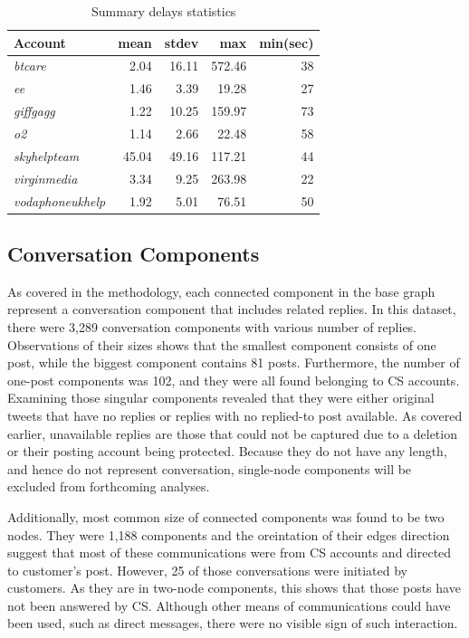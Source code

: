 \documentclass[sigconf]{acmart}
\begin{document}
\begin{table}[!h]
\centering
\begin{tabularx}{\columnwidth}{lrrrr}
\toprule
\textbf{Account} & \textbf{mean} & \textbf{stdev} & \textbf{max} & \textbf{min(sec)} \\ 
\midrule
{\emph{btcare}} & 2.04 & 16.11 & 572.46 & 38\\
{\emph{ee}} & 1.46 & 3.39 & 19.28 & 27\\
{\emph{giffgagg}} & 1.22 & 10.25 & 159.97 & 73\\ 
{\emph{o2}} & 1.14 & 2.66 & 22.48 & 58\\
{\emph{skyhelpteam}} & 45.04 & 49.16 & 117.21 & 44\\
{\emph{virginmedia}} & 3.34 & 9.25 & 263.98 & 22\\
{\emph{vodaphoneukhelp}} & 1.92 & 5.01 & 76.51 & 50\\
\bottomrule
\end{tabularx}
\caption{Summary delays statistics}
\label{tbl:delaystats}
\end{table}

\subsection{Conversation Components}

As covered in the methodology, each connected component in the
base graph represent a conversation component that includes related
replies. In this dataset, there were 3,289 conversation components
with various number of replies. Observations of their sizes shows that
the smallest component consists of one post, while the biggest
component contains 81 posts.  Furthermore, the number of one-post
components was 102, and they were all found belonging to CS
accounts. Examining those singular components revealed that they were
either original tweets that have no replies or replies with no
replied-to post available. As covered earlier, unavailable replies are
those that could not be captured due to a deletion or their posting
account being protected. Because they do not have any length, and
hence do not represent conversation, single-node
components will be excluded from forthcoming analyses.

Additionally, most common size of connected components was found to be
two nodes.  They were 1,188 components and the oreintation of their
edges direction suggest that most of these communications were from CS accounts
and directed to customer's post. However, 25 of those conversations
were initiated by customers.  As they are in two-node components, this
shows that those posts have not been answered by CS. Although other
means of communications could have been used, such as direct messages,
there were no visible sign of such interaction.
\end{document}
